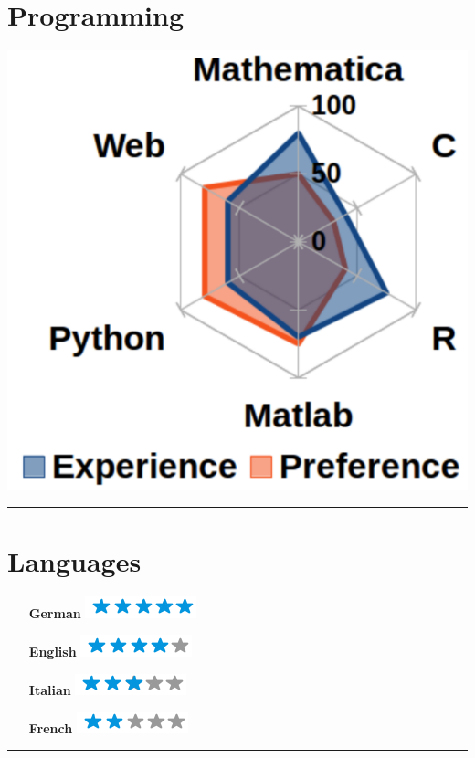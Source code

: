 \documentclass{article}
\begin{document}
\begin{minipage}[t]{0.28\textwidth}
    \section*{\fontsize{18pt}{24pt}\selectfont \color{pblue} Programming}
	\vspace{-2mm}
	\includegraphics[scale=0.3]{../img/programming.pdf}
	\vspace{2mm}
	\hrule
	\vspace{-2mm}
	\section*{\fontsize{18pt}{24pt}\selectfont \color{pblue} Languages}
	\vspace{-2mm}
	\begin{itemize}
	\centering
	\item[\textbf{German}] \includegraphics[scale=0.50]{../img/5stars.png}\vspace{-2mm}
	\item[\textbf{English}]  \includegraphics[scale=0.50]{../img/4stars.png}\vspace{-2mm}
    \item[\textbf{Italian}] \includegraphics[scale=0.5]{../img/3stars.png}\vspace{-2mm}
    \item[\textbf{French}]  \includegraphics[scale=0.50]{../img/2stars.png}
    \end{itemize}
	\hrule
	\vspace{-2mm}

\end{minipage}
\end{document}
